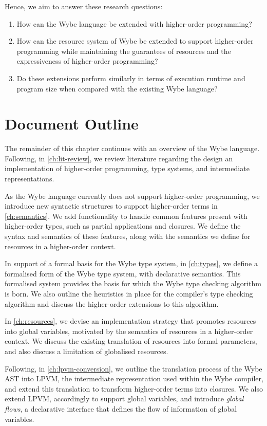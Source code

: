 Hence, we aim to answer these research questions:
\begin{enumerate}
  \item How can the Wybe language be extended with higher-order programming?
  \item How can the resource system of Wybe be extended to support higher-order programming while maintaining the guarantees of resources and the expressiveness of higher-order programming?
  \item Do these extensions perform similarly in terms of execution runtime and program size when compared with the existing Wybe language?
\end{enumerate}

\section{Document Outline}
\label{sec:doc-outline}

The remainder of this chapter continues with an overview of the Wybe language. Following, in \cref{ch:lit-review}, we review literature regarding the design an implementation of higher-order programming, type systems, and intermediate representations.

As the Wybe language currently does not support higher-order programming, we introduce new syntactic structures to support higher-order terms in \cref{ch:semantics}. We add functionality to handle common features present with higher-order types, such as partial applications and closures. We define the syntax and semantics of these features, along with the semantics we define for resources in a higher-order context.

In support of a formal basis for the Wybe type system, in \cref{ch:types}, we define a formalised form of the Wybe type system, with declarative semantics. This formalised system provides the basis for which the Wybe type checking algorithm is born. We also outline the heuristics in place for the compiler's type checking algorithm and discuss the higher-order extensions to this algorithm.

In \cref{ch:resources}, we devise an implementation strategy that promotes resources into global variables, motivated by the semantics of resources in a higher-order context. We discuss the existing translation of resources into formal parameters, and also discuss a limitation of globalised resources.

Following, in \cref{ch:lpvm-conversion}, we outline the translation process of the Wybe AST into LPVM, the intermediate representation used within the Wybe compiler, and extend this translation to transform higher-order terms into closures. We also extend LPVM, accordingly to support global variables, and introduce \textit{global flows}, a declarative interface that defines the flow of information of global variables.

